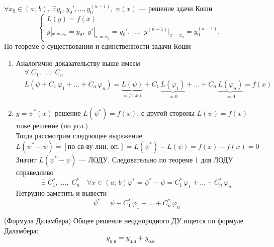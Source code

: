 \begin{Proof}
    
    $\forall x_0 \in (a;\,b),\; \exists y_0, y_0', \dots, y_0^{(n-1)},\; \psi(x)$ --- решение здачи Коши
    \[
        \begin{cases}
            L(y) = f(x)\\
            y|_{x = x_0} = y_0,\; y'|_{x = x_0} = y_0',\; \dots,\; y^{(n-1)}|_{x = x_0} = y^{(n-1)}_0,
        \end{cases}
    \]
    По теореме о существовании и единственности задачи Коши
    \begin{enumerate}
        \item Аналогично доказательству выше имеем
        \begin{align*}
            &\forall \; C_1,\; \dots,\; C_n\\
            &L(\psi + C_1\,\varphi_1 + \dots + C_n\,\varphi_n) = \underbrace{L(\psi)}_{= f(x)} + C_1\,\underbrace{L(\varphi_1)}_{= 0} + \dots + C_n\,\underbrace{L(\varphi_n)}_{= 0} = f(x)
        \end{align*}
        
        \item $y = \psi^*(x)$ решение $L(\psi^*) = f(x)$, с другой стороны $L(\psi) = f(x)$ тоже решение (по усл.)\\
        Тогда рассмотрим следующее выражение
        \[
            L(\psi^* - \psi) = [\text{по св-ву лин. оп.}] = L(\psi^*) - L(\psi) = f(x) - f(x) = 0
        \]
        Значит $L(\psi^* - \psi)$ --- ЛОДУ. Следовательно по теореме 1 для ЛОДУ справедливо
        \[
            \exists \; C_1^*,\; \dots,\; C_n^* \quad \forall x\in(a;\,b)  \varphi^* = \psi^* - \psi = C_1^*\,\varphi_1 + \dots + C_n^*\,\varphi_n 
        \]
        Нетрудно заметить и вывести
        \[
            \psi^* = \psi + C_1^*\,\varphi_1 + \dots + C_n^*\,\varphi_n
        \]
    \end{enumerate}
\end{Proof}

\begin{Note}(Формула Даламбера)
	Общее решение неоднородного ДУ ищется по формуле Даламбера:
	\[
		y_{\text{о.н}} = y_{\text{ч.н}} + y_{\text{о.о}}
	\]
\end{Note}